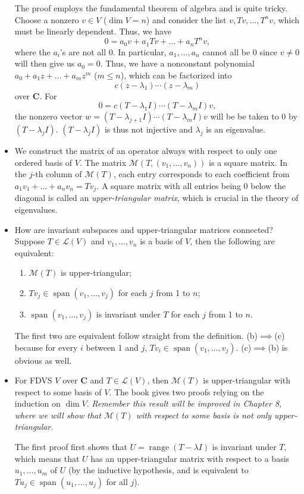 \documentclass[11pt]{article}
\newcommand{\df}[1]{\textit{\textsf{#1}}}
\newcommand{\C}{\mathbf{C}}
\newcommand{\s}{\operatorname{span}}
\renewcommand{\r}{\operatorname{range}}
\renewcommand{\d}{\dim}
\newcommand{\LV}{\mathcal{L}(V)}
\newcommand{\M}{\mathcal{M}}
\begin{document}
\begin{itemize}
    The proof employs the fundamental theorem of algebra and is quite tricky. Choose a nonzero $v \in V$ ($\d V=n$) and consider the list $v, Tv, \dots, T^n v$, which must be linearly dependent. Thus, we have $$0 = a_0 v + a_1 Tv + \dots + a_n T^n v,$$ where the $a_i$'s are not all $0$. In particular, $a_1, \dots, a_n$ cannot all be 0 since $v \not= 0$ will then give us $a_0 = 0$. Thus, we have a nonconstant polynomial $a_0+a_1 z+\dots+a_m z^m$ ($m \leq n$), which can be factorized into $$c(z - \lambda_1)\cdots(z - \lambda_m)$$ over $\C$. For $$0=c(T - \lambda_1 I)\cdots(T - \lambda_m I)v,$$ the nonzero vector $w = (T - \lambda_{j+1} I) \cdots (T - \lambda_m I)v$ will be be taken to 0 by $(T - \lambda_j I)$. $(T - \lambda_j I)$ is thus not injective and $\lambda_j$ is an eigenvalue.
    \item We construct the matrix of an operator always with respect to only one ordered basis of $V$. The matrix $\M(T,(v_1,\dots,v_n))$ is a square matrix. In the $j$-th column of $\M(T)$, each entry corresponds to each coefficient from $a_1v_1+\dots+a_nv_n = Tv_j$. A square matrix with all entries being 0 below the diagonal is called an \df{upper-triangular matrix}, which is crucial in the theory of eigenvalues.
    \item How are invariant subspaces and upper-triangular matrices connected? Suppose $T \in \LV$ and $v_1,\dots,v_n$ is a basis of $V$, then the following are equivalent:
    \begin{enumerate}[label=(\alph*)]
        \item $\M(T)$ is upper-triangular;
        \item $Tv_j \in \s(v_1,\dots,v_j)$ for each $j$ from 1 to $n$;
        \item $\s(v_1,\dots,v_j)$ is invariant under $T$ for each $j$ from 1 to $n$.
    \end{enumerate}
    The first two are equivalent follow straight from the definition. (b)$\implies$(c) because for every $i$ between 1 and $j$, $Tv_i \in \s(v_1,\dots,v_j)$. (c)$\implies$(b) is obvious as well.
    \item For FDVS $V$ over $\C$ and $T \in \LV$, then $\M(T)$ is upper-triangular with respect to some basis of $V$. The book gives two proofs relying on the induction on $\d V$. \emph{Remember this result will be improved in Chapter 8, where we will show that $\M(T)$ with respect to some basis is not only upper-triangular.}
    
    The first proof first shows that $U = \r(T - \lambda I)$ is invariant under $T$, which means that $U$ has an upper-triangular matrix with respect to a basis $u_1,\dots,u_m$ of $U$ (by the inductive hypothesis, and is equivalent to $Tu_j \in \s(u_1,\dots,u_j)$ for all $j$).
    

\end{itemize}
\end{document}
